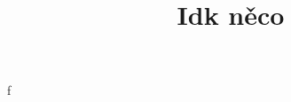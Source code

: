 \documentclass{article}
\title{\vspace{-2cm}Idk něco\vspace{-1.7cm}}
\date{}
\author{}
\begin{document}
\maketitle

f
\end{document}
